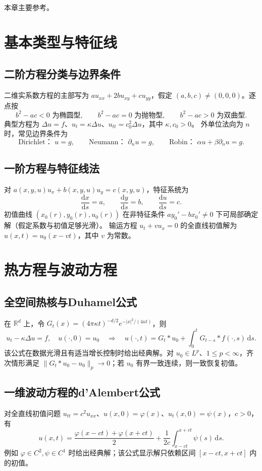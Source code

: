 \documentclass[../main.tex]{subfiles}
\begin{document}
本章主要参考\cite{hunter,brezis}。

\section{基本类型与特征线}
\subsection{二阶方程分类与边界条件}
二维实系数方程的主部写为 $a u_{xx}+2b u_{xy}+c u_{yy}$，假定 $(a,b,c)\ne(0,0,0)$。逐点按
\[
b^2-ac<0\text{ 为椭圆型},\qquad b^2-ac=0\text{ 为抛物型},\qquad
b^2-ac>0\text{ 为双曲型}.
\]
典型方程为 $\Delta u=f$、$u_t=\kappa\Delta u$、$u_{tt}=c_0^2\Delta u$，其中 $\kappa,c_0>0$。
外单位法向为 $n$ 时，常见边界条件为
\[
\text{Dirichlet： }u=g,\qquad
\text{Neumann： }\partial_nu=g,\qquad
\text{Robin： }\alpha u+\beta\partial_nu=g.
\]
\subsection{一阶方程与特征线法}
对 $a(x,y,u)u_x+b(x,y,u)u_y=c(x,y,u)$，特征系统为
\[
\frac{\mathrm dx}{\mathrm ds}=a,\qquad
\frac{\mathrm dy}{\mathrm ds}=b,\qquad
\frac{\mathrm du}{\mathrm ds}=c.
\]
初值曲线 $(x_0(r),y_0(r),u_0(r))$ 在非特征条件 $a y_0'-b x_0'\ne0$ 下可局部确定解（假定系数与初值足够光滑）。
输运方程 $u_t+v u_x=0$ 的全直线初值解为 $u(x,t)=u_0(x-vt)$，其中 $v$ 为常数。
\section{热方程与波动方程}
\subsection{全空间热核与Duhamel公式}
在 $\mathbb R^d$ 上，令 $G_t(x)=(4\pi\kappa t)^{-d/2}e^{-|x|^2/(4\kappa t)}$，则
\[
u_t-\kappa\Delta u=f,\quad u(\cdot,0)=u_0
\quad\Longrightarrow\quad
u(\cdot,t)=G_t*u_0+\int_0^tG_{t-s}*f(\cdot,s)\,\mathrm ds.
\]
该公式在数据光滑且有适当增长控制时给出经典解。对 $u_0\in L^p$、$1\le p<\infty$，齐次情形满足 $\|G_t*u_0-u_0\|_p\to0$；若 $u_0$ 有界一致连续，则一致恢复初值。
\subsection{一维波动方程的d'Alembert公式}
对全直线初值问题 $u_{tt}=c^2u_{xx}$、$u(x,0)=\varphi(x)$、$u_t(x,0)=\psi(x)$，$c>0$，有
\[
u(x,t)=\frac{\varphi(x-ct)+\varphi(x+ct)}2
+\frac1{2c}\int_{x-ct}^{x+ct}\psi(s)\,\mathrm ds.
\]
例如 $\varphi\in C^2,\psi\in C^1$ 时给出经典解；该公式显示解只依赖区间 $[x-ct,x+ct]$ 内的初值。
\end{document}

